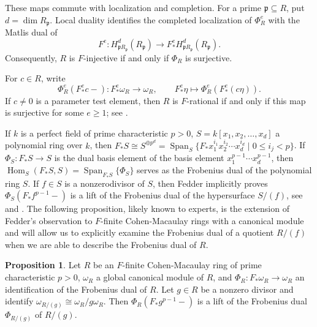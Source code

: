 \documentclass[reqno,11pt]{amsart}
\numberwithin{equation}{section}
\theoremstyle{definition}
\theoremstyle{definition}
\newtheorem{proposition}[theorem]{Proposition}
\theoremstyle{definition}
\theoremstyle{remark}
\newcommand{\Hom}{\operatorname{Hom}}
\newcommand{\Span}{\operatorname{Span}}
\begin{document}
These maps commute with localization and completion. For a prime $\mathfrak p\subseteq R$, put $d=\dim R_{\mathfrak p}$. Local duality identifies the completed localization of $\Phi_R^e$
with the Matlis dual of
\[
    F^e:H^d_{\mathfrak pR_{\mathfrak p}}(R_{\mathfrak p})
    \longrightarrow
    F_*^eH^d_{\mathfrak pR_{\mathfrak p}}(R_{\mathfrak p}).
\]
Consequently, $R$ is $F$-injective if and only if $\Phi_R$ is surjective.

For $c\in R$, write
\[
    \Phi_R^e(F_*^ec-):F_*^e\omega_R\longrightarrow\omega_R,
    \qquad
    F_*^e\eta\longmapsto\Phi_R^e(F_*^e(c\eta)).
\]
If $c\neq0$ is a parameter test element, then $R$ is $F$-rational if and only if this map is surjective for some $e\geq1$; see \cite[Proposition~2.3]{DSPS25}.


If $k$ is a perfect field of prime characteristic $p>0$, $S = k[x_1,x_2,\ldots,x_d]$ a polynomial ring over $k$, then $F_*S\cong S^{\oplus p^d} = \Span_S\{F_*x_1^{i_1}x_2^{i_2}\cdots x_d^{i_d}\mid 0\leq i_j<p\}$. If $\Phi_S:F_*S\to S$ is the dual basis element of the basis element $x_1^{p-1}\cdots x_d^{p-1}$, then $\Hom_{S}(F_*S,S) = \Span_{F_*S}\{\Phi_S\}$ serves as the Frobenius dual of the polynomial ring $S$. If $f\in S$ is a nonzerodivisor of $S$, then Fedder implicitly proves $\Phi_S(F_*f^{p-1}-)$ is a lift of the Frobenius dual of the hypersurface $S/(f)$, see \cite[Corollary Page 465]{Fed83} and \cite[Lemma~8.13]{Sta16}. The following proposition, likely known to experts, is the extension of Fedder's observation to $F$-finite Cohen-Macaulay rings with a canonical module and will allow us to explicitly examine the Frobenius dual of a quotient $R/(f)$ when we are able to describe the Frobenius dual of $R$.

\begin{proposition}
    \label{proposition: Fedder for Frobenius dual}
    Let $R$ be an $F$-finite Cohen-Macaulay ring of prime characteristic $p>0$, $\omega_R$ a global canonical module of $R$, and $\Phi_R:F_*\omega_R\to \omega_R$ an identification of the Frobenius dual of $R$. Let $g\in R$ be a nonzero divisor and identify $\omega_{R/(g)}\cong \omega_{R}/g\omega_R$. Then $\Phi_{R}(F_*g^{p-1}-)$ is a lift of the Frobenius dual $\Phi_{R/(g)}$ of $R/(g)$.
\end{proposition}
\end{document}
